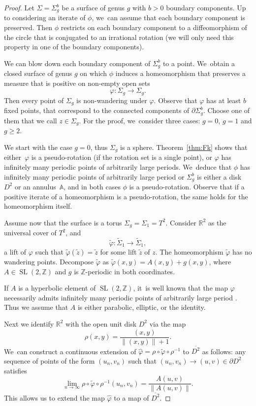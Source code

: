 \documentclass[10pt]{amsart}
\DeclareMathOperator{\SL}{SL}
\theoremstyle{definition}
\begin{document}
\begin{proof}
Let $\Sigma=\Sigma_g^b$ be a surface of genus $g$ with $b>0$ boundary components. Up to considering an iterate of $\phi$, we~can assume that each boundary component is preserved. Then $\phi$ restricts on each boundary component to a diffeomorphism of the circle that is conjugated to an irrational rotation (we will only need this property in one of the boundary components).

We can blow down each boundary component of $\Sigma_g^b$ to a point. We~obtain a closed surface of genus $g$ on which $\phi$ induces a homeomorphism that preserves a measure that is positive on non-empty open sets
\[
\varphi: \Sigma_g \to \Sigma_g.
\]
Then every point of $\Sigma_g$ is non-wandering under $\varphi$.
Observe that $\varphi$ has at least $b$ fixed points, that correspond to the connected components of $\partial \Sigma_g^b$. Choose one of them that we call $z\in \Sigma_g$. For the proof, we~consider three cases: $g=0$, $g=1$ and $g\geq 2$.

We start with the case $g=0$, thus $\Sigma_g$ is a sphere. Theorem~\ref{thm:Fk} shows that either~$\varphi$ is a pseudo-rotation (if the rotation set is a single point), or $\varphi$ has infinitely many periodic points of arbitrarily large periods. We~deduce that $\phi$ has infinitely many periodic points of arbitrarily large period or $\Sigma_g^b$ is either a disk $D^2$ or an annulus~$\mathbb{A}$, and in both cases $\phi$ is a pseudo-rotation. Observe that if a positive iterate of a homeomorphism is a pseudo-rotation, the same holds for the homeomorphism itself.

Assume now that the surface is a torus $\Sigma_g=\Sigma_1=T^2$. Consider $\mathbb{R}^2$ as the universal cover of $T^2$, and
\[
\widetilde \varphi: \widetilde \Sigma_1 \to \widetilde \Sigma_1,
\]
a lift of $\varphi$ such that $\widetilde \varphi(\widetilde z)=\widetilde z$ for some lift $\widetilde z$ of $z$. The homeomorphism $\widetilde \varphi$ has no wandering points. Decompose $\widetilde \varphi$ as
$\widetilde \varphi(x,y)= A(x,y) + g(x,y)$,
where $A\in \SL(2,\mathbb{Z})$ and $g$ is $\mathbb{Z}$-periodic in both coordinates.

If $A$ is a hyperbolic element of $\SL(2,\mathbb{Z})$, it~is well known that the map $\varphi$ necessarily admits infinitely many periodic points of arbitrarily large period \cite{F0, Ha}. Thus we assume that $A$ is either parabolic, elliptic, or the identity.

Next we identify $\mathbb{R}^2$ with the open unit disk $D^2$ via the map
\[
\rho(x,y)=\frac{(x,y)}{\|(x,y)\|+1}.
\]
We~can construct a continuous extension of $\widehat \varphi= \rho\circ \widetilde \varphi \circ \rho^{-1}$ to $ \overline{D^2}$ as follows: any sequence of points of the form $(u_n,v_n)$ such that $ (u_n,v_n) \rightarrow (u,v) \in \partial D^2$ satisfies
\[
\lim_{n \to \infty} \rho \circ \widetilde \varphi \circ \rho^{-1} (u_n,v_n) = \frac{A(u,v)}{\|A(u,v)\|}.
\]
This allows us to extend the map $\widehat \varphi$ to a map of $\overline{D^2}$.


\end{proof}
\end{document}
